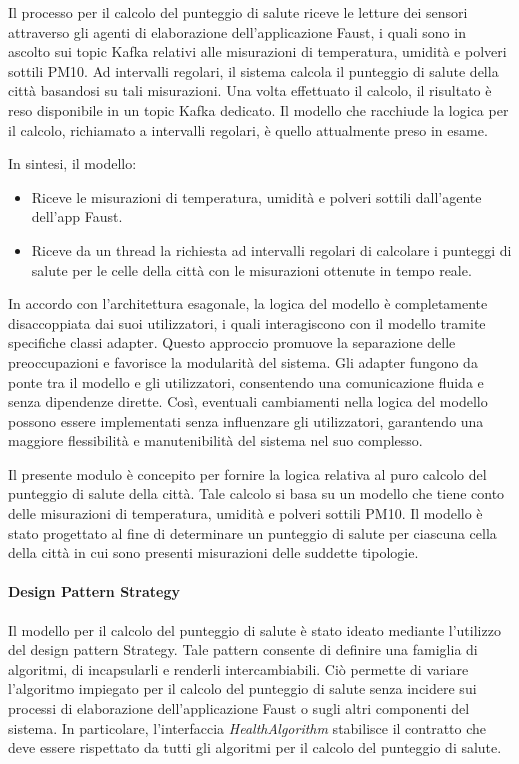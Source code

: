 Il processo per il calcolo del punteggio di salute riceve le letture dei sensori attraverso gli agenti di elaborazione dell'applicazione Faust, i quali sono in ascolto sui topic Kafka relativi alle misurazioni di temperatura, umidità e polveri sottili PM10. Ad intervalli regolari, il sistema calcola il punteggio di salute della città basandosi su tali misurazioni. Una volta effettuato il calcolo, il risultato è reso disponibile in un topic Kafka dedicato.
Il modello che racchiude la logica per il calcolo, richiamato a intervalli regolari, è quello attualmente preso in esame.

In sintesi, il modello:
\begin{itemize}
    \item Riceve le misurazioni di temperatura, umidità e polveri sottili dall'agente dell'app Faust.
    \item Riceve da un thread la richiesta ad intervalli regolari di calcolare i punteggi di salute per le celle della città con le misurazioni ottenute in tempo reale.
\end{itemize}

In accordo con l'architettura esagonale, la logica del modello è completamente disaccoppiata dai suoi utilizzatori, i quali interagiscono con il modello tramite specifiche classi adapter. Questo approccio promuove la separazione delle preoccupazioni e favorisce la modularità del sistema. Gli adapter fungono da ponte tra il modello e gli utilizzatori, consentendo una comunicazione fluida e senza dipendenze dirette. Così, eventuali cambiamenti nella logica del modello possono essere implementati senza influenzare gli utilizzatori, garantendo una maggiore flessibilità e manutenibilità del sistema nel suo complesso.

Il presente modulo è concepito per fornire la logica relativa al puro calcolo del punteggio di salute della città. Tale calcolo si basa su un modello che tiene conto delle misurazioni di temperatura, umidità e polveri sottili PM10. Il modello è stato progettato al fine di determinare un punteggio di salute per ciascuna cella della città in cui sono presenti misurazioni delle suddette tipologie.

\paragraph*{Design Pattern Strategy}

Il modello per il calcolo del punteggio di salute è stato ideato mediante l'utilizzo del design pattern Strategy. Tale pattern consente di definire una famiglia di algoritmi, di incapsularli e renderli intercambiabili. Ciò permette di variare l'algoritmo impiegato per il calcolo del punteggio di salute senza incidere sui processi di elaborazione dell'applicazione Faust o sugli altri componenti del sistema. In particolare, l'interfaccia \textit{HealthAlgorithm} stabilisce il contratto che deve essere rispettato da tutti gli algoritmi per il calcolo del punteggio di salute.


